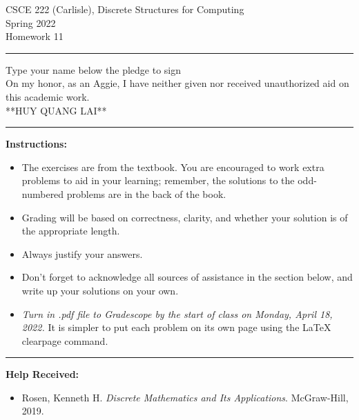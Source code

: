 \documentclass[12pt]{article}  %
\begin{document}
\begin{center}         %
{\large                %
CSCE 222 (Carlisle), Discrete Structures for Computing \\  %
Spring 2022 \\
Homework 11}
\end{center}
\rule{6in}{.1pt}       %
\begin{center}
{\large
Type your name below the pledge to sign\\
On my honor, as an Aggie, I have neither given nor received unauthorized aid on this academic work.\\
**HUY QUANG LAI**}
\end{center}


\rule{6in}{.1pt}       %
                    
\noindent              %
{\bf Instructions:}    %

\begin{itemize}        %
\item The exercises are from the textbook.  You are encouraged to work
      extra problems to aid in your learning; remember, the solutions to 
      the odd-numbered problems are in the back of the book.
\item Grading will be based on correctness, clarity, and whether your
      solution is of the appropriate length.
\item Always justify your answers.
\item Don't forget to acknowledge all sources of assistance in the section below, and write up your solutions on your own.
\item {\em Turn in .pdf file to Gradescope by the start of class on Monday, April 18, 2022.}  It is simpler to put each problem on its own page using the LaTeX clearpage command.
\end{itemize}


\rule{6in}{.1pt}       %

{\bf Help Received:}    %
\begin{itemize}
\item Rosen, Kenneth H. \textit{Discrete Mathematics and Its Applications}. McGraw-Hill, 2019.
\end{itemize}
\end{document}
